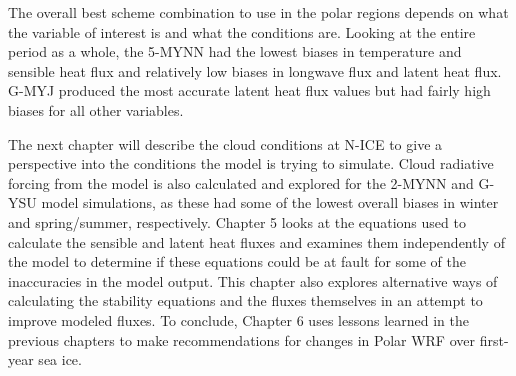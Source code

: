 The overall best scheme combination to use in the polar regions depends on what the variable of interest is and what the conditions are. Looking at the entire period as a whole, the 5-MYNN had the lowest biases in temperature and sensible heat flux and relatively low biases in longwave flux and latent heat flux. G-MYJ produced the most accurate latent heat flux values but had fairly high biases for all other variables. 

The next chapter will describe the cloud conditions at N-ICE to give a perspective into the conditions the model is trying to simulate. Cloud radiative forcing from the model is also calculated and explored for the 2-MYNN and G-YSU model simulations, as these had some of the lowest overall biases in winter and spring/summer, respectively. Chapter 5 looks at the equations used to calculate the sensible and latent heat fluxes and examines them independently of the model to determine if these equations could be at fault for some of the inaccuracies in the model output. This chapter also explores alternative ways of calculating the stability equations and the fluxes themselves in an attempt to improve modeled fluxes. To conclude, Chapter 6 uses lessons learned in the previous chapters to make recommendations for changes in Polar WRF over first-year sea ice. 